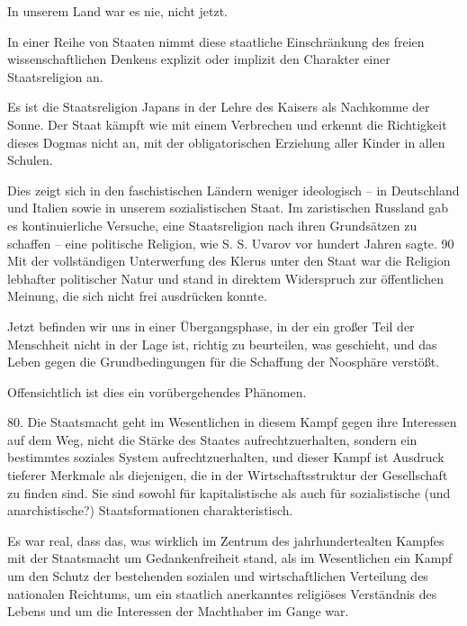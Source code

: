 \documentclass[11pt,a4paper]{book}
\begin{document}
In unserem Land war es nie, nicht jetzt.



In einer Reihe von Staaten nimmt diese staatliche Einschränkung des freien wissenschaftlichen Denkens explizit oder implizit den Charakter einer Staatsreligion an.



Es ist die Staatsreligion Japans in der Lehre des Kaisers als Nachkomme der Sonne. Der Staat kämpft wie mit einem Verbrechen und erkennt die Richtigkeit dieses Dogmas nicht an, mit der obligatorischen Erziehung aller Kinder in allen Schulen.



Dies zeigt sich in den faschistischen Ländern weniger ideologisch -- in Deutschland und Italien sowie in unserem sozialistischen Staat. Im zaristischen Russland gab es kontinuierliche Versuche, eine Staatsreligion nach ihren Grundsätzen zu schaffen -- eine politische Religion, wie S. S. Uvarov vor hundert Jahren sagte. 90 Mit der vollständigen Unterwerfung des Klerus unter den Staat war die Religion lebhafter politischer Natur und stand in direktem Widerspruch zur öffentlichen Meinung, die sich nicht frei ausdrücken konnte. 



Jetzt befinden wir uns in einer Übergangsphase, in der ein großer Teil der Menschheit nicht in der Lage ist, richtig zu beurteilen, was geschieht, und das Leben gegen die Grundbedingungen für die Schaffung der Noosphäre verstößt.



Offensichtlich ist dies ein vorübergehendes Phänomen.



80. Die Staatsmacht geht im Wesentlichen in diesem Kampf gegen ihre Interessen auf dem Weg, nicht die Stärke des Staates aufrechtzuerhalten, sondern ein bestimmtes soziales System aufrechtzuerhalten, und dieser Kampf ist Ausdruck tieferer Merkmale als diejenigen, die in der Wirtschaftsstruktur der Gesellschaft zu finden sind. Sie sind sowohl für kapitalistische als auch für sozialistische (und anarchistische?) Staatsformationen charakteristisch.



Es war real, dass das, was wirklich im Zentrum des jahrhundertealten Kampfes mit der Staatsmacht um Gedankenfreiheit stand, als im Wesentlichen ein Kampf um den Schutz der bestehenden sozialen und wirtschaftlichen Verteilung des nationalen Reichtums, um ein staatlich anerkanntes religiöses Verständnis des Lebens und um die Interessen der Machthaber im Gange war.
\end{document}
